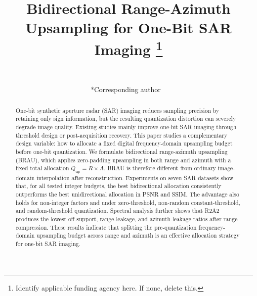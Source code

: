 \documentclass[conference]{IEEEtran}
\begin{document}
\title{Bidirectional Range-Azimuth Upsampling for One-Bit SAR Imaging
\thanks{Identify applicable funding agency here. If none, delete this.}
}

\author{
~\\
\and
{}
*Corresponding author
~\\
\and
{}
}

\maketitle

\begin{abstract}
One-bit synthetic aperture radar (SAR) imaging reduces sampling precision by retaining only sign information, but the resulting quantization distortion can severely degrade image quality. Existing studies mainly improve one-bit SAR imaging through threshold design or post-acquisition recovery. This paper studies a complementary design variable: how to allocate a fixed digital frequency-domain upsampling budget before one-bit quantization. We formulate bidirectional range-azimuth upsampling (BRAU), which applies zero-padding upsampling in both range and azimuth with a fixed total allocation $Q_{\mathrm{up}}=R\times A$. BRAU is therefore different from ordinary image-domain interpolation after reconstruction. Experiments on seven SAR datasets show that, for all tested integer budgets, the best bidirectional allocation consistently outperforms the best unidirectional allocation in PSNR and SSIM. The advantage also holds for non-integer factors and under zero-threshold, non-random constant-threshold, and random-threshold quantization. Spectral analysis further shows that R2A2 produces the lowest off-support, range-leakage, and azimuth-leakage ratios after range compression. These results indicate that splitting the pre-quantization frequency-domain upsampling budget across range and azimuth is an effective allocation strategy for one-bit SAR imaging.
\end{abstract}
\end{document}
